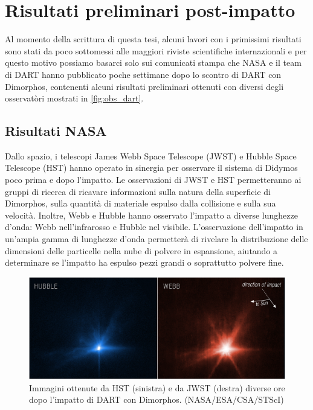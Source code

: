 \documentclass[a4paper,11pt,openright]{book}
\begin{document}
\chapter{Risultati preliminari post-impatto}\label{ch:ch_5}
Al momento della scrittura di questa tesi, alcuni lavori con i primissimi risultati sono stati da poco sottomessi alle maggiori riviste scientifiche internazionali e per questo motivo possiamo basarci solo sui comunicati stampa che NASA e il team di DART hanno pubblicato poche settimane dopo lo scontro di DART con Dimorphos, contenenti alcuni risultati preliminari ottenuti con diversi degli osservatòri mostrati in \cref{fig:obs_dart}. 

\section{Risultati NASA}
Dallo spazio, i telescopi James Webb Space Telescope (JWST) e Hubble Space Telescope (HST) hanno operato in sinergia per osservare il sistema di Didymos poco prima e dopo l'impatto. Le osservazioni di JWST e HST permetteranno ai gruppi di ricerca di ricavare informazioni sulla natura della superficie di Dimorphos, sulla quantità di materiale espulso dalla collisione e sulla sua velocità. Inoltre, Webb e Hubble hanno osservato l'impatto a diverse lunghezze d'onda: Webb nell'infrarosso e Hubble nel visibile. L'osservazione dell'impatto in un'ampia gamma di lunghezze d'onda permetterà di rivelare la distribuzione delle dimensioni delle particelle nella nube di polvere in espansione, aiutando a determinare se l'impatto ha espulso pezzi grandi o soprattutto polvere fine. 

\begin{figure}[!h]
    \centering
    \includegraphics[width=\textwidth]{figure/jwst_hst_impact.png}
    \caption[Immagini ottenute da Hubble e da Webb diverse ore dopo l'impatto di DART con Dimorphos.]{Immagini ottenute da HST (sinistra) e da JWST (destra) diverse ore dopo l'impatto di DART con Dimorphos. (NASA/ESA/CSA/STScI)}
    \label{fig:jwst_hst_impact}
\end{figure}
\end{document}

